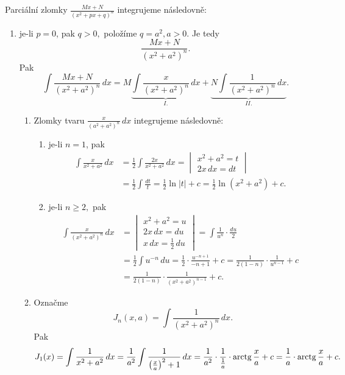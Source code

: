 \begin{pozn}
Parciální zlomky $\frac{Mx+N}{(x^2+px+q)^n}$ integrujeme následovně:
\begin{enumerate}[1.]
    \item je-li $p=0$, pak $q>0,$ položíme $q=a^2,a>0$. Je tedy
    $$\frac{Mx+N}{(x^2+a^2)^n}.$$
    Pak
    $$\int \frac{Mx+N}{(x^2+a^2)^n}\, dx = M\underbrace{\int \frac{x}{(x^2+a^2)^n}\, dx}_{I.} + \underbrace{N\int \frac{1}{(x^2+a^2)^n}\, dx}_{II.}.$$
    \begin{enumerate}[$I.$]
    \item Zlomky tvaru $\frac{x}{(a^2+a^2)^n}\, dx$ integrujeme následovně:
    \begin{enumerate}[$i.$]
    \item je-li $n=1$, pak
    \begin{align*}
        \int \frac{x}{x^2+a^2}\, dx &= \frac{1}{2}\int \frac{2x}{x^2+a^2}\, dx = \begin{vmatrix}
            x^2+a^2=t \\
            2x\, dx = dt
        \end{vmatrix} \\
        &=\frac{1}{2} \int \frac{dt}{t}=\frac{1}{2}\ln |t|+c=\frac{1}{2}\ln(x^2+a^2)+c.
    \end{align*}
   	\item je-li $n \geq 2,$ pak
    \begin{align*}
        \int \frac{x}{(x^2+a^2)^n}\, dx &= \begin{vmatrix}
            x^2+a^2=u \\
            2x\, dx = du \\
            x\, dx = \frac{1}{2}\, du
        \end{vmatrix}=\int \frac{1}{u^n}\cdot \frac{du}{2} \\
        &= \frac{1}{2}\int u^{-n}\, du = \frac{1}{2}\cdot \frac{u^{-n+1}}{-n+1}+c =\frac{1}{2(1-n)}\cdot \frac{1}{u^{n-1}}+c \\
        & = \frac{1}{2(1-n) }\cdot\frac{1}{(x^2+a^2)^{n-1}}+c.
    \end{align*}
    \end{enumerate}
   	\item Označme
    $$J_n(x,a)=\int \frac{1}{(x^2+a^2)^n}\, dx.$$ Pak
    $$
        J_1(x)= \int \frac{1}{x^2+a^2} \, dx = \frac{1}{a^2}\int \frac{1}{\left ( \frac{x}{a} \right )^2+1 }\, dx =\frac{1}{a^2}\cdot \frac{1}{\frac{1}{a}}\cdot \operatorname{arctg} \frac{x}{a} + c = \frac{1}{a}\cdot \operatorname{arctg} \frac{x}{a}+c.
$$
\end{enumerate}
\end{enumerate}
\end{pozn}
